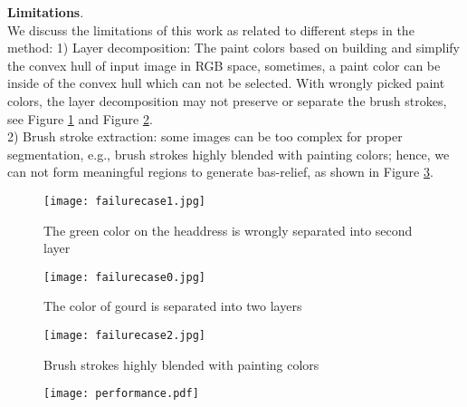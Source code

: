 \textbf{Limitations}.\\ We discuss the limitations of this work as related to different steps in the method:
1) Layer decomposition: The paint colors based on building and simplify the  convex hull of input image in RGB space, sometimes, a paint color can be inside of the convex hull which can not be selected. With wrongly picked paint colors, the layer decomposition may not preserve or separate the brush strokes, see Figure \ref{failgirl} and Figure \ref{failhulu}. \\
2) Brush stroke extraction: some images can be too complex for proper segmentation, e.g., brush strokes highly blended with  painting colors; hence, we can not form meaningful regions to generate bas-relief, as shown in Figure \ref{failland}.
\begin{figure}[H]
	\centering
	\texttt{[image: failurecase1.jpg]}
	\caption{The green color on the headdress is wrongly separated into second layer}
	\label{failgirl}
\end{figure}

\begin{figure}[H]
	\centering
	\texttt{[image: failurecase0.jpg]}
	\caption{The color of gourd is separated into two layers}
	\label{failhulu}
\end{figure}

\begin{figure}[H]
	\centering
	\texttt{[image: failurecase2.jpg]}
	\caption{Brush strokes highly blended with painting colors}
	\label{failland}
\end{figure}



\begin{figure}[H]
	\centering
	\texttt{[image: performance.pdf]}

\end{figure}


